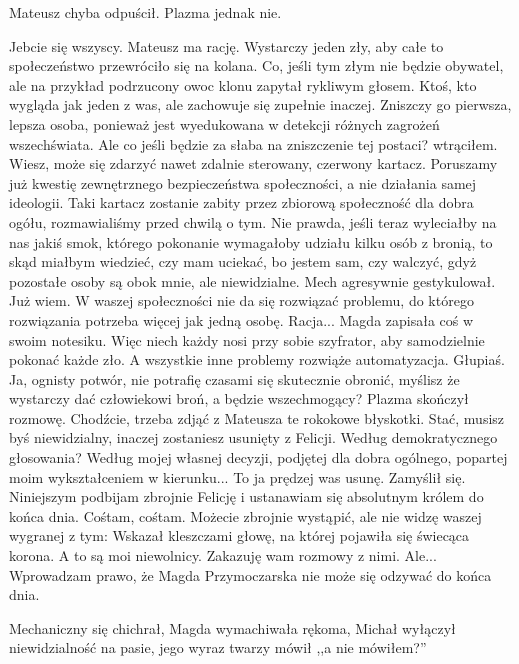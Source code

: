 Mateusz chyba odpuścił. Plazma jednak nie.
\begin{dialogue}
\ds{} Jebcie się wszyscy. Mateusz ma rację. Wystarczy jeden zły, aby całe to społeczeństwo przewróciło się na kolana. 
Co, jeśli tym złym nie będzie obywatel, ale na przykład podrzucony owoc klonu \dm{} zapytał rykliwym głosem. \dm{} Ktoś, kto wygląda jak jeden z was, ale zachowuje się zupełnie inaczej.
\ds{} Zniszczy go pierwsza, lepsza osoba, ponieważ jest wyedukowana w detekcji różnych zagrożeń wszechświata.
\ds{} Ale co jeśli będzie za słaba na zniszczenie tej postaci? \dm{} wtrąciłem. \dm{} Wiesz, może się zdarzyć nawet zdalnie sterowany, czerwony kartacz.
\ds{} Poruszamy już kwestię zewnętrznego bezpieczeństwa społeczności, a nie działania samej ideologii. 
Taki kartacz zostanie zabity przez zbiorową społeczność dla dobra ogółu, rozmawialiśmy przed chwilą o tym.
\ds{} Nie prawda, jeśli teraz wyleciałby na nas jakiś smok, którego pokonanie wymagałoby udziału kilku osób z bronią, to skąd miałbym wiedzieć, czy mam uciekać, bo jestem sam, czy walczyć, gdyż pozostałe osoby są obok mnie, ale niewidzialne. \dm{} Mech agresywnie gestykulował. \dm{} 
Już wiem. W waszej społeczności nie da się rozwiązać problemu, do którego rozwiązania potrzeba więcej jak jedną osobę.
\ds{} Racja... \dm{} Magda zapisała coś w swoim notesiku. \dm{} Więc niech każdy nosi przy sobie szyfrator, aby samodzielnie pokonać każde zło. A wszystkie inne problemy rozwiąże automatyzacja.
\ds{} Głupiaś. Ja, ognisty potwór, nie potrafię czasami się skutecznie obronić, myślisz że wystarczy dać człowiekowi broń, a będzie wszechmogący? \dm{} 
Plazma skończył rozmowę. \dm{} Chodźcie, trzeba zdjąć z Mateusza te rokokowe błyskotki.
\ds{} Stać, musisz byś niewidzialny, inaczej zostaniesz usunięty z Felicji.
\ds{} Według demokratycznego głosowania?
\ds{} Według mojej własnej decyzji, podjętej dla dobra ogólnego, popartej moim wykształceniem w kierunku...
\ds{} To ja prędzej was usunę. \dm{} Zamyślił się. \dm{} Niniejszym podbijam zbrojnie Felicję i ustanawiam się absolutnym królem do końca dnia. Cośtam, cośtam. 
Możecie zbrojnie wystąpić, ale nie widzę waszej wygranej z tym: \dm{} Wskazał kleszczami głowę, na której pojawiła się świecąca korona. \dm{} 
A to są moi niewolnicy. Zakazuję wam rozmowy z nimi.
\ds{} Ale...
\ds{} Wprowadzam prawo, że Magda Przymoczarska nie może się odzywać do końca dnia.
\end{dialogue}

Mechaniczny się chichrał, Magda wymachiwała rękoma, Michał wyłączył niewidzialność na pasie, jego wyraz twarzy mówił ,,a nie mówiłem?''

